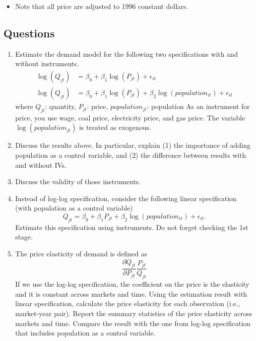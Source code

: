 \documentclass[]{book}
\providecommand{\tightlist}{%
  \setlength{\itemsep}{0pt}\setlength{\parskip}{0pt}}
\begin{document}
\begin{itemize}
\tightlist
\item
  Note that all price are adjusted to 1996 constant dollars.
\end{itemize}

\subsection{Questions}\label{questions-1}

\begin{enumerate}
\def\labelenumi{\arabic{enumi}.}
\item
  Estimate the demand model for the following two specifications with
  and without instruments. \[
  \begin{aligned}
  \log(Q_{jt}) & = \beta_0 + \beta_1 \log(P_{jt}) + \epsilon_{it} \\ 
  \log(Q_{jt}) & = \beta_0 + \beta_1 \log(P_{jt}) + \beta_2 \log (population_{it}) + \epsilon_{it} 
  \end{aligned}
  \] where \(Q_{jt}\): quantity, \(P_{jt}\): price, \(population_{jt}\):
  population As an instrument for price, you use wage, coal price,
  electricity price, and gas price. The variable
  \(\log(population_{jt})\) is treated as exogenous.
\item
  Discuss the results above. In particular, explain (1) the importance
  of adding population as a control variable, and (2) the difference
  between results with and without IVs.
\item
  Discuss the validity of those instruments.
\item
  Instead of log-log specification, consider the following linear
  specification (with population as a control variable) \[
  Q_{jt}  = \beta_0 + \beta_1 P_{jt} + \beta_2 \log(population_{it}) + \epsilon_{it}. 
  \] Estimate this specification using instruments. Do not forget
  checking the 1st stage.
\item
  The price elasticity of demand is defined as \[
  \frac{\partial Q_{jt}}{\partial P_{jt} } \frac{P_{jt}}{Q_{jt}} 
  \] If we use the log-log specification, the coefficient on the price
  is the elasticity and it is constant across markets and time. Using
  the estimation result with linear specification, calculate the price
  elasticity for each observation (i.e., market-year pair). Report the
  summary statistics of the price elasticity across markets and time.
  Compare the result with the one from log-log specification that
  includes population as a control variable.
\end{enumerate}
\end{document}
